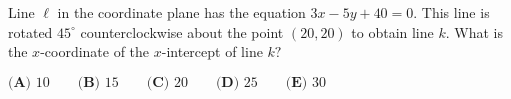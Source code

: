 Line $\ell$ in the coordinate plane has the equation $3x - 5y + 40 = 0$. This line is rotated $45^{\circ}$ counterclockwise about the point $(20, 20)$ to obtain line $k$. What is the $x$-coordinate of the $x$-intercept of line $k?$

$\textbf{(A) } 10 \qquad \textbf{(B) } 15 \qquad \textbf{(C) } 20 \qquad \textbf{(D) } 25 \qquad \textbf{(E) } 30$